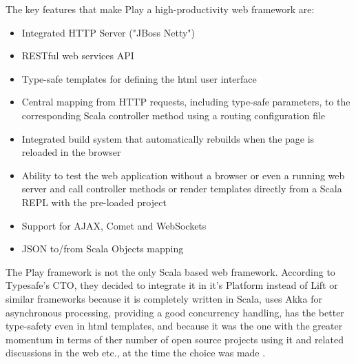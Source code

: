 The key features that make Play a high-productivity web framework are:
 
\begin{itemize}
\item Integrated HTTP Server ("JBoss Netty")
\item RESTful web services API 
\item Type-safe templates for defining the html user interface
\item Central mapping from HTTP requests, including type-safe parameters, to the corresponding Scala controller method using a routing configuration file
\item Integrated build system that automatically rebuilds when the page is reloaded in the browser
\item Ability to test the web application without a browser or even a running web server and call controller methods or render templates directly from a Scala REPL with the pre-loaded project 
\item Support for AJAX, Comet and WebSockets
\item JSON to/from Scala Objects mapping
\end{itemize}

The Play framework is not the only Scala based web framework. According to Typesafe's CTO, they decided to integrate it in it's Platform instead of Lift or similar frameworks because it is completely written in Scala, uses Akka for asynchronous processing, providing a good concurrency handling, has the better type-safety even in html templates, and because it was the one with the greater momentum in terms of ther number of open source projects using it and related discussions in the web etc., at the time the choice was made \cite[cf.][]{playdecision}.
